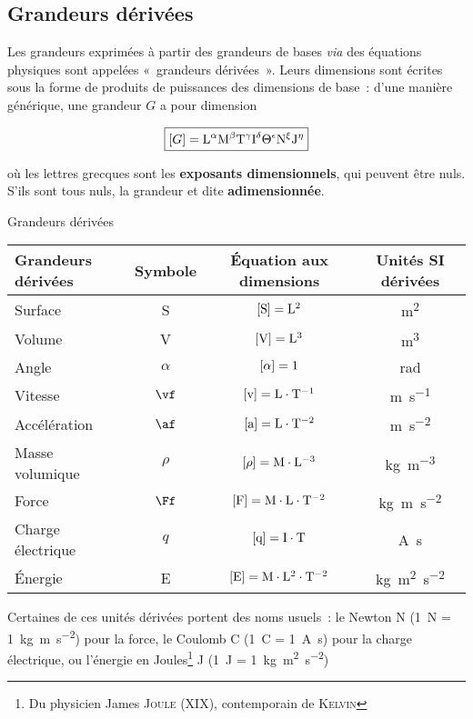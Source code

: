 \documentclass[../main/main.tex]{subfiles}
\begin{document}
\subsection{Grandeurs dérivées}

Les grandeurs exprimées à partir des grandeurs de bases \textit{via} des
équations physiques sont appelées «~grandeurs dérivées~». Leurs dimensions sont
écrites sous la forme de produits de puissances des dimensions de base~: d'une
manière générique, une grandeur $G$ a pour dimension

\[\boxed{[G] = \rm L^\alpha M^\beta T^\gamma I^\delta \Theta^\epsilon N^\xi
		J^\eta}\]

où les lettres grecques sont les \textbf{exposants dimensionnels}, qui peuvent
être nuls. S'ils sont tous nuls, la grandeur et dite \textbf{adimensionnée}.

\begin{exem}[label=exem:grandeurs]{Grandeurs dérivées}
	\begin{center}
		\begin{tabular}{lccc}
			\toprule
			Grandeurs dérivées & Symbole  & Équation aux dimensions            & Unités SI dérivées \\
			\midrule
			Surface            & S        & $\rm [S] = L^2$                    & \si{m^2}           \\
			Volume             & V        & $\rm [V] = L^3$                    & \si{m^3}           \\
			Angle              & $\alpha$ & $\rm [\alpha] = 1$                 & \si{rad}           \\
			Vitesse            & $\vf$    & $\rm [v] = L\cdot T^{-1}$          & \si{m.s^{-1}}      \\
			Accélération       & $\af$    & $\rm [a] = L\cdot T^{-2}$          & \si{m.s^{-2}}      \\
			Masse volumique    & $\rho$   & $\rm [\rho] = M\cdot L^{-3}$       & \si{kg.m^{-3}}     \\
			Force              & $\Ff$    & $\rm [F] = M\cdot L\cdot T^{-2}$   & \si{kg.m.s^{-2}}   \\
			Charge électrique  & $q$      & $\rm [q] = I\cdot T$               & \si{A.s}           \\
			Énergie            & E        & $\rm [E] = M\cdot L^2\cdot T^{-2}$ & \si{kg.m^2.s^{-2}} \\
			\bottomrule
		\end{tabular}
	\end{center}
	Certaines de ces unités dérivées portent des noms usuels~: le Newton N
	(\SI{1}{N} = \SI{1}{kg.m.s^{-2}}) pour la force, le Coulomb C (\SI{1}{C} =
	\SI{1}{A.s}) pour la charge électrique, ou l'énergie en Joules\footnote{Du
		physicien James \textsc{Joule} (XIX\ieme), contemporain de \textsc{Kelvin}}
	J (\SI{1}{J} = \SI{1}{kg.m^2.s^{-2}})
\end{exem}
\end{document}
